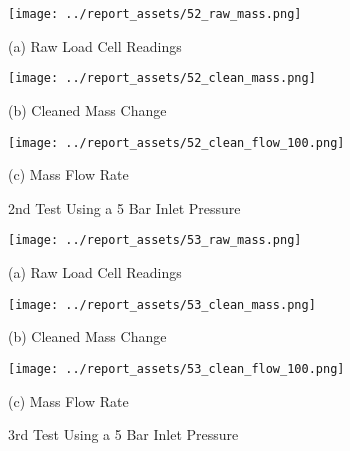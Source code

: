 \begin{figure}[htbp]
    \centering

    \begin{minipage}{0.32\textwidth}
        \centering
        \texttt{[image: ../report\_assets/52\_raw\_mass.png]}
        \caption*{(a) Raw Load Cell Readings}
    \end{minipage}
    \hfill
    \begin{minipage}{0.32\textwidth}
        \centering
        \texttt{[image: ../report\_assets/52\_clean\_mass.png]}
        \caption*{(b) Cleaned Mass Change}
    \end{minipage}
    \hfill
    \begin{minipage}{0.32\textwidth}
        \centering
        \texttt{[image: ../report\_assets/52\_clean\_flow\_100.png]}
        \caption*{(c) Mass Flow Rate}
    \end{minipage}
    \caption{2nd Test Using a 5 Bar Inlet Pressure}
    
\end{figure}\label{fig:52}
\vfill

\begin{figure}[htbp]
    \centering

    \begin{minipage}{0.32\textwidth}
        \centering
        \texttt{[image: ../report\_assets/53\_raw\_mass.png]}
        \caption*{(a) Raw Load Cell Readings}
    \end{minipage}
    \hfill
    \begin{minipage}{0.32\textwidth}
        \centering
        \texttt{[image: ../report\_assets/53\_clean\_mass.png]}
        \caption*{(b) Cleaned Mass Change}
    \end{minipage}
    \hfill
    \begin{minipage}{0.32\textwidth}
        \centering
        \texttt{[image: ../report\_assets/53\_clean\_flow\_100.png]}
        \caption*{(c) Mass Flow Rate}
    \end{minipage}
    \caption{3rd Test Using a 5 Bar Inlet Pressure}
    
\end{figure}\label{fig:53}
\vfill
\newpage

